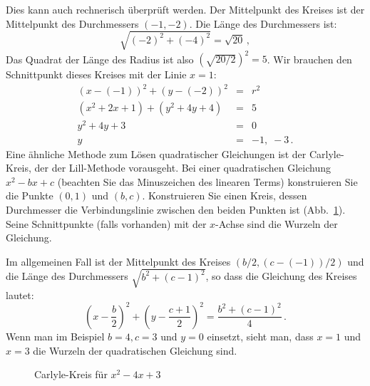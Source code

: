 Dies kann auch rechnerisch überprüft werden. Der Mittelpunkt des Kreises ist der Mittelpunkt des Durchmessers $(-1,-2)$. Die Länge des Durchmessers ist:
\[
\sqrt{(-2)^2+(-4)^2}=\sqrt{20}\,,
\]
Das Quadrat der Länge des Radius ist also $\left(\sqrt{20/2}\right)^2=5$. Wir brauchen den Schnittpunkt dieses Kreises mit der Linie $x=1$:
\begin{eqnarray*}
(x-(-1))^2+(y-(-2))^2&=&r^2\\
(x^2+2x+1)+(y^2+4y+4)&=&5\\
y^2+4y+3&=&0\\
y&=&-1,\;-3\,.
\end{eqnarray*}
Eine ähnliche Methode zum Lösen quadratischer Gleichungen ist der Carlyle-Kreis, der der Lill-Methode vorausgeht. Bei einer quadratischen Gleichung $x^2-bx+c$ (beachten Sie das Minuszeichen des linearen Terms) konstruieren Sie die Punkte $(0,1)$ und $(b,c)$. Konstruieren Sie einen Kreis, dessen Durchmesser die Verbindungslinie zwischen den beiden Punkten ist (Abb.~\ref{f.carlyle-circle}). Seine Schnittpunkte (falls vorhanden) mit der $x$-Achse sind die Wurzeln der Gleichung.

Im allgemeinen Fall ist der Mittelpunkt des Kreises $(b/2,(c-(-1))/2)$ und die Länge des Durchmessers $\sqrt{b^2+(c-1)^2}$, so dass die Gleichung des Kreises lautet:
\[
\left(x-\frac{b}{2}\right)^2+\left(y-\frac{c+1}{2}\right)^2=
\frac{b^2+(c-1)^2}{4}\,.
\]
Wenn man im Beispiel $b=4,c=3$ und $y=0$ einsetzt, sieht man, dass $x=1$ und $x=3$ die Wurzeln der quadratischen Gleichung sind.

\begin{figure}[t]
\begin{center}
\end{center}
\caption{Carlyle-Kreis für $x^2-4x+3$}\label{f.carlyle-circle}
\end{figure}

